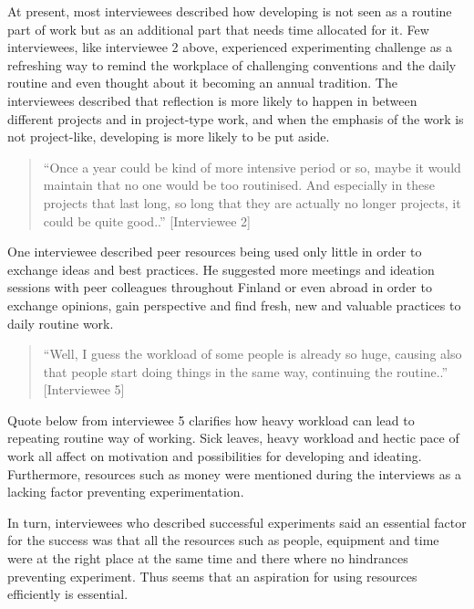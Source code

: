 At present, most interviewees described how developing is not seen as a routine part of work but as an additional part that needs time allocated for it. Few interviewees, like interviewee 2 above, experienced experimenting challenge as a refreshing way to remind the workplace of challenging conventions and the daily routine and even thought about it becoming an annual tradition. The interviewees described that reflection is more likely to happen in between different projects and in project-type work, and when the emphasis of the work is not project-like, developing is more likely to be put aside. 
\begin{quote}
``Once a year could be kind of more intensive period or so, maybe it would maintain that no one would be too routinised. And especially in these projects that last long, so long that they are actually no longer projects, it could be quite good..'' [Interviewee 2]
\end{quote}
One interviewee described peer resources being used only little in order to exchange ideas and best practices. He suggested more meetings and ideation sessions with peer colleagues throughout Finland or even abroad in order to exchange opinions, gain perspective and find fresh, new and valuable practices to daily routine work. 
\begin{quote}
``Well, I guess the workload of some people is already so huge, causing also that people start doing things in the same way, continuing the routine..'' [Interviewee 5]
\end{quote}
Quote below from interviewee 5 clarifies how heavy workload can lead to repeating routine way of working. Sick leaves, heavy workload and hectic pace of work all affect on motivation and possibilities for developing and ideating. Furthermore, resources such as money were mentioned during the interviews as a lacking factor preventing experimentation. 

In turn, interviewees who described successful experiments said an essential factor for the success was that all the resources such as people, equipment and time were at the right place at the same time and there where no hindrances preventing experiment. Thus seems that an aspiration for using resources efficiently is essential. 

